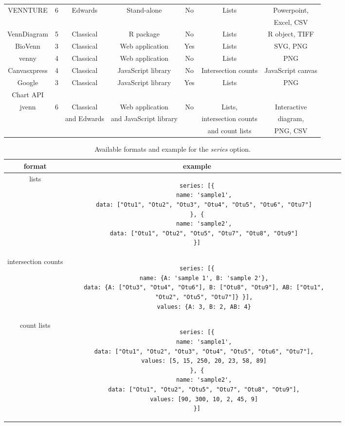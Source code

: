 \documentclass{bmcart}
\begin{document}
\begin{backmatter}
\begin{table}[h!]
\begin{tabular}{c|cccccc}
		VENNTURE \cite{Bronwen2012} &  6 & Edwards & Stand-alone & No & Lists &
		Powerpoint,\\ 
		& & & & & & Excel, CSV \\ \hline
		
		VennDiagram \cite{RVennDiagram} &  5 & Classical & R package & No & Lists
		& R object, TIFF \\ \hline
		
		BioVenn \cite{Hulsen2008} &  3 & Classical & Web application & Yes &
		Lists & SVG, PNG \\ \hline
		
		venny \cite{venny} &  4 & Classical & Web application & No &
		Lists & PNG \\ \hline
		 
		Canvasxpress \cite{canvasxpress} &  4 & Classical & JavaScript library &
		No & Intersection counts & JavaScript canvas \\ \hline
		
		Google & 3 & Classical & JavaScript library &
		Yes & Lists & PNG \\ 
		Chart API \cite{googleAPI} & & & & & & \\ \hline \hline
			
		jvenn & 6 & Classical & Web application & No & Lists,
		& Interactive 
		\\
		& & and Edwards & and JavaScript library & & intersection counts & diagram, \\
		& & & & & and count lists & PNG, CSV
	\end{tabular}
\end{table}


\begin{table}[h!]
\caption{Available formats and example for the \textit{series} option.}
      \begin{tabular}{cccc}
        \hline
        format & example\\ \hline
        lists & 
\begin{lstlisting}
series: [{
	name: 'sample1',
	data: ["Otu1", "Otu2", "Otu3", "Otu4", "Otu5", "Otu6", "Otu7"]
}, {
	name: 'sample2',
	data: ["Otu1", "Otu2", "Otu5", "Otu7", "Otu8", "Otu9"]
}]
\end{lstlisting}\\ \hline
        intersection counts & 
\begin{lstlisting}
series: [{
	name: {A: 'sample 1', B: 'sample 2'},
	data: {A: ["Otu3", "Otu4", "Otu6"], B: ["Otu8", "Otu9"], AB: ["Otu1",
	"Otu2", "Otu5", "Otu7"]} }],
	values: {A: 3, B: 2, AB: 4}
\end{lstlisting}\\ \hline
        count lists  &
\begin{lstlisting}
series: [{
	name: 'sample1',
	data: ["Otu1", "Otu2", "Otu3", "Otu4", "Otu5", "Otu6", "Otu7"],
	values: [5, 15, 250, 20, 23, 58, 89]
}, {
	name: 'sample2',
	data: ["Otu1", "Otu2", "Otu5", "Otu7", "Otu8", "Otu9"],
	values: [90, 300, 10, 2, 45, 9]
}]
\end{lstlisting}\\ \hline
      \end{tabular}
\end{table}

\end{backmatter}
\end{document}
